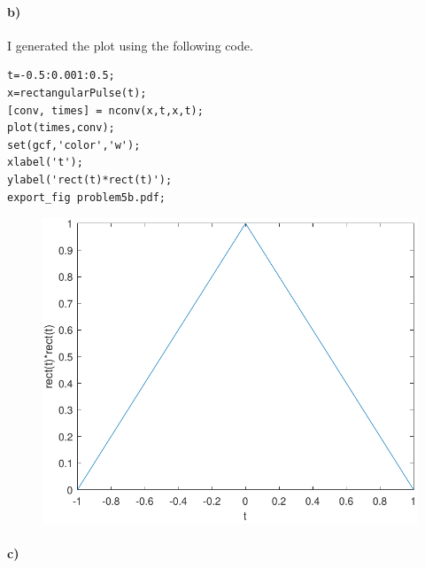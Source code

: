 \documentclass[12pt]{article}
\begin{document}
\pagebreak

\paragraph{b)}

I generated the plot using the following code.
\begin{verbatim}
t=-0.5:0.001:0.5;
x=rectangularPulse(t);
[conv, times] = nconv(x,t,x,t);
plot(times,conv);
set(gcf,'color','w');
xlabel('t');
ylabel('rect(t)*rect(t)');
export_fig problem5b.pdf;
\end{verbatim}
\begin{figure}[H]
    \begin{center}
        \includegraphics[width=4.5in]{problem5b.pdf}
    \end{center}
\end{figure}

\pagebreak

\paragraph{c)}
\end{document}
